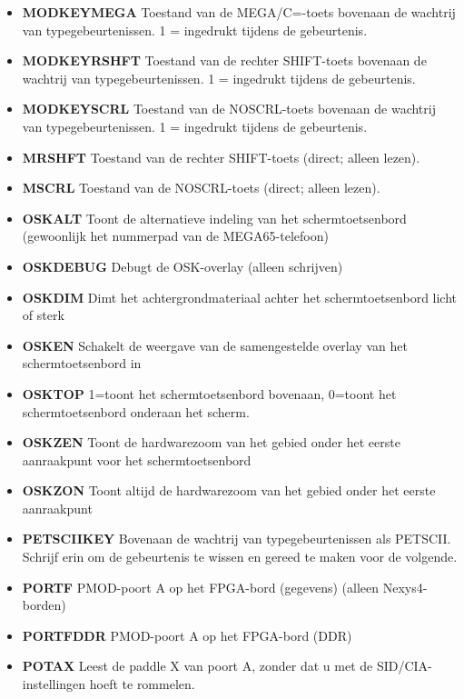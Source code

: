 \begin{itemize}
\item{\bf{MODKEYMEGA}} Toestand van de MEGA/C=-toets bovenaan de wachtrij van typegebeurtenissen. 1 = ingedrukt tijdens de gebeurtenis.
\item{\bf{MODKEYRSHFT}} Toestand van de rechter SHIFT-toets bovenaan de wachtrij van typegebeurtenissen. 1 = ingedrukt tijdens de gebeurtenis.
\item{\bf{MODKEYSCRL}} Toestand van de NOSCRL-toets bovenaan de wachtrij van typegebeurtenissen. 1 = ingedrukt tijdens de gebeurtenis.
\item{\bf{MRSHFT}} Toestand van de rechter SHIFT-toets (direct; alleen lezen).
\item{\bf{MSCRL}} Toestand van de NOSCRL-toets (direct; alleen lezen).
\item{\bf{OSKALT}} Toont de alternatieve indeling van het schermtoetsenbord (gewoonlijk het nummerpad van de MEGA65-telefoon)
\item{\bf{OSKDEBUG}} Debugt de OSK-overlay (alleen schrijven)
\item{\bf{OSKDIM}} Dimt het achtergrondmateriaal achter het schermtoetsenbord licht of sterk
\item{\bf{OSKEN}} Schakelt de weergave van de samengestelde overlay van het schermtoetsenbord in
\item{\bf{OSKTOP}} 1=toont het schermtoetsenbord bovenaan, 0=toont het schermtoetsenbord onderaan het scherm.
\item{\bf{OSKZEN}} Toont de hardwarezoom van het gebied onder het eerste aanraakpunt voor het schermtoetsenbord
\item{\bf{OSKZON}} Toont altijd de hardwarezoom van het gebied onder het eerste aanraakpunt
\item{\bf{PETSCIIKEY}} Bovenaan de wachtrij van typegebeurtenissen als PETSCII. Schrijf erin om de gebeurtenis te wissen en gereed te maken voor de volgende.
\item{\bf{PORTF}} PMOD-poort A op het FPGA-bord (gegevens) (alleen Nexys4-borden)
\item{\bf{PORTFDDR}} PMOD-poort A op het FPGA-bord (DDR)
\item{\bf{POTAX}} Leest de paddle X van poort A, zonder dat u met de SID/CIA-instellingen hoeft te rommelen.

\end{itemize}
